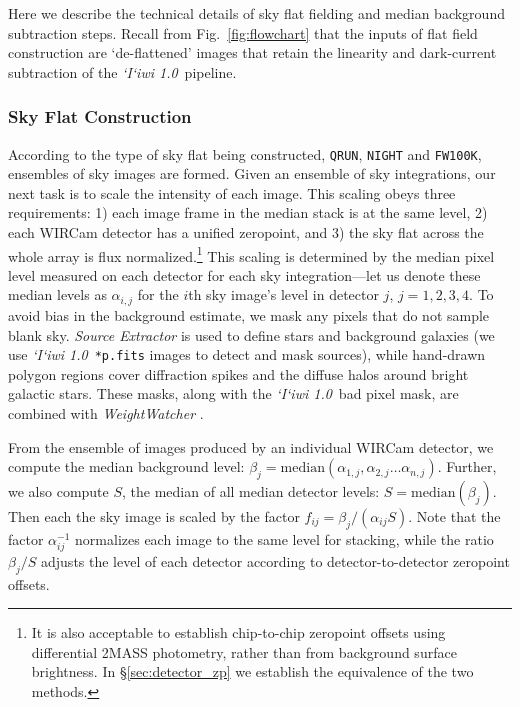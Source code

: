 \documentclass[iop]{emulateapj}
\newcommand{\sw}[1]{\textit{#1}} %
\newcommand{\iiwione}{\sw{`I`iwi 1.0}}
\newcommand{\Fig}[1]{Fig.~\ref{fig:#1}}  %
\newcommand{\Sec}[1]{\S\ref{sec:#1}}  %
\begin{document}
Here we describe the technical details of sky flat fielding and median background subtraction steps.
Recall from \Fig{flowchart} that the inputs of flat field construction are `de-flattened' images that retain the linearity and dark-current subtraction of the \iiwione\ pipeline.

\subsubsection{Sky Flat Construction}

According to the type of sky flat being constructed, \texttt{QRUN}, \texttt{NIGHT} and \texttt{FW100K}, ensembles of sky images are formed.
Given an ensemble of sky integrations, our next task is to scale the intensity of each image.
This scaling obeys three requirements: 1) each image frame in the median stack is at the same level, 2) each WIRCam detector has a unified zeropoint, and 3) the sky flat across the whole array is flux normalized.\footnote{It is also acceptable to establish chip-to-chip zeropoint offsets using differential 2MASS photometry, rather than from background surface brightness. In \Sec{detector_zp} we establish the equivalence of the two methods.}
This scaling is determined by the median pixel level measured on each detector for each sky integration---let us denote these median levels as $\alpha_{i,j}$ for the $i$th sky image's level in detector $j$, $j=1, 2, 3, 4$.
To avoid bias in the background estimate, we mask any pixels that do not sample blank sky.
\sw{Source Extractor} \citep{Bertin:1996} is used to define stars and background galaxies (we use \iiwione\ \texttt{*p.fits} images to detect and mask sources), while hand-drawn polygon regions cover diffraction spikes and the diffuse halos around bright galactic stars. These masks, along with the \iiwione\ bad pixel mask, are combined with \sw{WeightWatcher} \citep{Marmo:2008}.

From the ensemble of images produced by an individual WIRCam detector, we compute the median background level: $\beta_j = \mathrm{median}(\alpha_{1,j}, \alpha_{2,j}\ldots \alpha_{n,j} )$.
Further, we also compute $S$, the median of all median detector levels: $S=\mathrm{median}(\beta_j)$.
Then each the sky image is scaled by the factor $f_{ij} = \beta_j / (\alpha_{ij} S)$.
Note that the factor $\alpha_{ij}^{-1}$ normalizes each image to the same level for stacking, while the ratio $\beta_j / S$ adjusts the level of each detector according to detector-to-detector zeropoint offsets.
\end{document}
